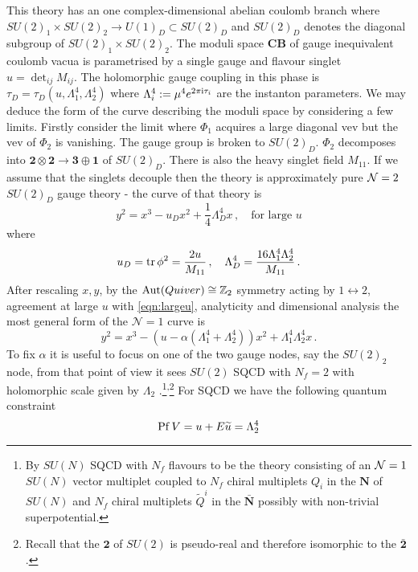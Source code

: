 \documentclass[main.tex]{subfiles}
\begin{document}
This theory has an one complex-dimensional abelian coulomb branch where $SU(2)_1\times SU(2)_2\to U(1)_D\subset SU(2)_D$ and $SU(2)_D$ denotes the diagonal subgroup of $SU(2)_1\times SU(2)_2$. The moduli space $\mathbf{CB}$ of gauge inequivalent coulomb vacua is parametrised by a single gauge and flavour singlet $u=\det_{ij}M_{ij}$. The holomorphic gauge coupling in this phase is  $\tau_D=\tau_D\left(u,\Lambda_1^4,\Lambda_2^4\right)$ where $\Lambda_i^4:=\mu^4 e^{2\pi\mathrm{i}\tau_i}$ are the instanton parameters. We may deduce the form of the curve describing the moduli space by considering a few limits. Firstly consider the limit where $\Phi_1$ acquires a large diagonal vev but the vev of $\Phi_2$ is vanishing. The gauge group is broken to $SU(2)_D$. $\Phi_2$ decomposes into $\mathbf{2}\otimes\mathbf{2}\to \mathbf{3}\oplus\mathbf{1}$ of $SU(2)_D$. There is also the heavy singlet field $M_{11}$. If we assume that the singlets decouple then the theory is approximately pure $\mathcal{N}=2$ $SU(2)_D$ gauge theory - the curve of that theory is
\begin{equation}\label{eqn:largeu}
y^2=x^3-u_Dx^2+\frac{1}{4}\Lambda_D^4x\,,\quad\text{for large $u$}
\end{equation} 
where
\begin{equation}
u_D=\operatorname{tr}\phi^2=\frac{2u}{M_{11}}\,,\quad \Lambda_D^4=\frac{16\Lambda_1^4\Lambda_2^4}{M_{11}}\,.
\end{equation}
After rescaling $x,y$, by the $\operatorname{Aut}(Quiver)\cong\mathbb{Z}_2$ symmetry acting by $1\leftrightarrow 2$, agreement at large $u$ with \eqref{eqn:largeu}, analyticity and dimensional analysis the most general form of the $\mathcal{N}=1$ curve is
\begin{equation}\label{eqn:alphacurve}
y^2=x^3-\left(u-\alpha(\Lambda_1^4+\Lambda_2^4)\right)x^2+\Lambda_1^4\Lambda_2^4x\,.
\end{equation} 
To fix $\alpha$ it is useful to focus on one of the two gauge nodes, say the $SU(2)_2$ node, from that point of view it sees $SU(2)$ SQCD with $N_f=2$ with holomorphic scale given by $\Lambda_2$ .\footnote{By $SU(N)$ SQCD with $N_f$ flavours to be the theory consisting of an $\mathcal{N}=1$ $SU(N)$ vector multiplet coupled to $N_f$ chiral multiplets $Q_i$ in the $\mathbf{N}$ of $SU(N)$ and $N_f$ chiral multiplets $\widetilde{Q}^i$ in the $\bar{\mathbf{N}}$ possibly with non-trivial superpotential.}\textsuperscript{,}\footnote{Recall that the $\mathbf{2}$ of $SU(2)$ is pseudo-real and therefore isomorphic to the $\bar{\mathbf{2}}$.} For SQCD we have the following quantum constraint
\begin{equation}\label{eqn:constraint}
\operatorname{Pf} V=u+E\widetilde{u}=\Lambda_2^4
\end{equation}
\end{document}
